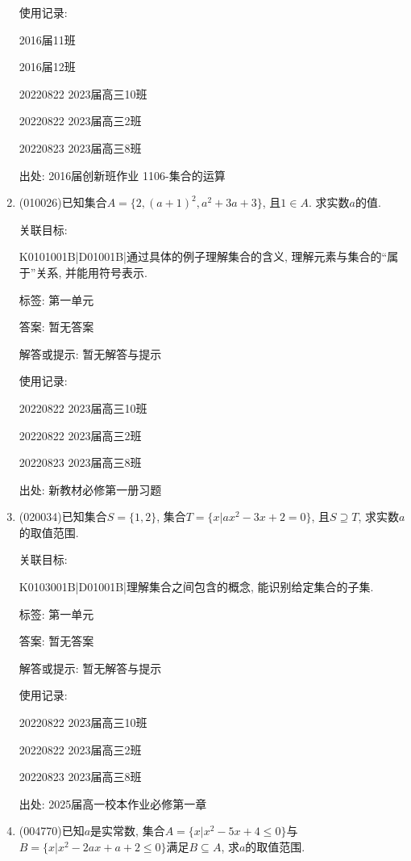 \documentclass[10pt,a4paper]{article}
\begin{document}
\begin{enumerate}[1.]
使用记录:

2016届11班	

2016届12班	

20220822	2023届高三10班	

20220822	2023届高三2班	

20220823	2023届高三8班	


出处: 2016届创新班作业	1106-集合的运算
\item { (010026)}已知集合$A=\{2, (a+1)^2, a^2+3a+3\}$, 且$1\in A$. 求实数$a$的值.


关联目标:

K0101001B|D01001B|通过具体的例子理解集合的含义, 理解元素与集合的``属于''关系, 并能用符号表示.



标签: 第一单元

答案: 暂无答案

解答或提示: 暂无解答与提示

使用记录:

20220822	2023届高三10班	

20220822	2023届高三2班	

20220823	2023届高三8班	


出处: 新教材必修第一册习题
\item { (020034)}已知集合$S=\{1, 2\}$, 集合$T=\{x|ax^2-3x+2=0\}$, 且$S\supseteq T$, 求实数$a$的取值范围.


关联目标:

K0103001B|D01001B|理解集合之间包含的概念, 能识别给定集合的子集.



标签: 第一单元

答案: 暂无答案

解答或提示: 暂无解答与提示

使用记录:

20220822	2023届高三10班	

20220822	2023届高三2班	

20220823	2023届高三8班	


出处: 2025届高一校本作业必修第一章
\item { (004770)}已知$a$是实常数, 集合$A=\{x|x^2-5x+4\le 0\}$与$B=\{x|x^2-2ax+a+2\le 0\}$满足$B\subseteq A$, 求$a$的取值范围.



\end{enumerate}
\end{document}

